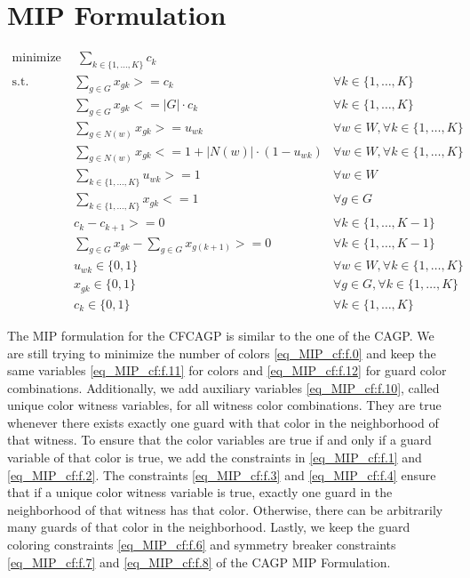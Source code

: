 \section{MIP Formulation}

\begin{align}
\label{eq_MIP_cf:f.0} \mbox{minimize}~& \;\sum_{k\in \{1,\ldots,K\}} c_{k}& \\
\label{eq_MIP_cf:f.1} \mbox{s.t. } &\sum_{g \in G}x_{gk} >= c_{k} & \forall k\in \{1,\ldots,K\}\\
\label{eq_MIP_cf:f.2}&\sum_{g\in G}x_{gk} <= |G|\cdot  c_{k} & \forall k\in \{1,\ldots,K\}\\
\label{eq_MIP_cf:f.3}&\sum_{g\in N(w)}x_{gk} >= u_{wk} & \forall w\in W, \forall k\in \{1,\ldots,K\}\\
\label{eq_MIP_cf:f.4}&\sum_{g\in N(w)}x_{gk} <= 1 + |N(w)|\cdot  (1-u_{wk}) & \forall w\in W, \forall k\in \{1,\ldots,K\}\\
\label{eq_MIP_cf:f.5}&\sum_{k\in \{1,\ldots,K\}}u_{wk} >= 1 & \forall w\in W\\
\label{eq_MIP_cf:f.6}&\sum_{k\in \{1,\ldots,K\}}x_{gk} <= 1 & \forall g\in G\\
\label{eq_MIP_cf:f.7}&c_{k} - c_{k+1} >= 0 & \forall k\in \{1,\ldots,K-1\}\\
\label{eq_MIP_cf:f.8}&\sum_{g\in G}x_{gk} - \sum_{g\in G}x_{g(k+1)} >= 0 & \forall k\in \{1,\ldots,K-1\}\\
\label{eq_MIP_cf:f.10}& u_{wk} \in \{0,1\} & \forall w\in W, \forall k\in \{1,\ldots,K\}\\
\label{eq_MIP_cf:f.11}& x_{gk} \in \{0,1\} & \forall g\in G, \forall k\in \{1,\ldots,K\}\\
\label{eq_MIP_cf:f.12}& c_{k}\in \{0,1\} & \forall k\in \{1,\ldots,K\}
\end{align}

The MIP formulation for the CFCAGP is similar to the one of the CAGP. We are still trying to minimize the number of colors \cref{eq_MIP_cf:f.0} and keep the same variables \cref{eq_MIP_cf:f.11} for colors and \cref{eq_MIP_cf:f.12} for guard color combinations. Additionally, we add auxiliary variables \cref{eq_MIP_cf:f.10}, called unique color witness variables, for all witness color combinations. They are true whenever there exists exactly one guard with that color in the neighborhood of that witness. To ensure that the color variables are true if and only if a guard variable of that color is true, we add the constraints in \cref{eq_MIP_cf:f.1} and \cref{eq_MIP_cf:f.2}. The constraints \cref{eq_MIP_cf:f.3} and \cref{eq_MIP_cf:f.4} ensure that if a unique color witness variable is true, exactly one guard in the neighborhood of that witness has that color. Otherwise, there can be arbitrarily many guards of that color in the neighborhood. Lastly, we keep the guard coloring constraints \cref{eq_MIP_cf:f.6} and symmetry breaker constraints \cref{eq_MIP_cf:f.7} and \cref{eq_MIP_cf:f.8} of the CAGP MIP Formulation.

